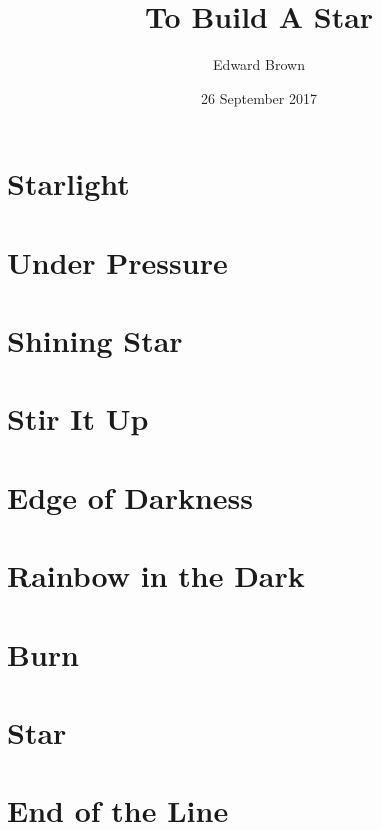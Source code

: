 \documentclass[profonts,stix,symmetric]{astro-bookshelf}
\title{To Build A Star}
\author{Edward Brown}
\date{26 September 2017}
\begin{document}
\frontmatter
{}


\mainmatter
{}
\setcounter{page}{1}

\chapter{Starlight}\label{ch.starlight}


\chapter{Under Pressure}\label{ch.basic-stellar-properties}


\chapter{Shining Star}\label{ch.radiative-transport}


\chapter{Stir It Up}\label{ch.convection}


\chapter{Edge of Darkness}\label{ch.stellar-atmospheres}


\chapter{Rainbow in the Dark}\label{ch.classifying-stars}


\chapter{Burn}\label{ch.nuclear-burning}


\chapter{Star}\label{ch.main-sequence}


\chapter{End of the Line}\label{ch.post-main-sequence}



\backmatter


\end{document}
